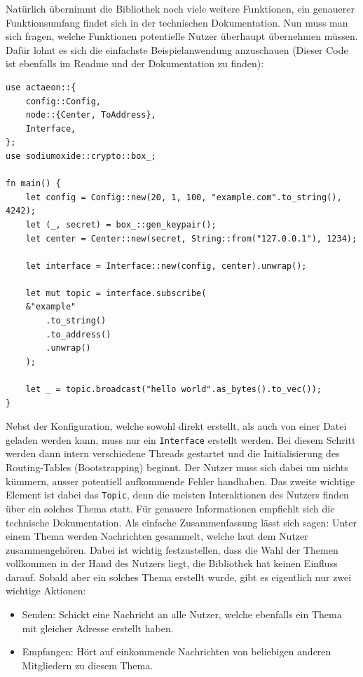 \documentclass[a4paper,11pt,titlepage,twoside]{memoir}
\begin{document}
\noindent Natürlich übernimmt die Bibliothek noch viele weitere
Funktionen, ein genauerer Funktionsumfang findet sich in der
technischen Dokumentation. Nun muss man sich fragen, welche Funktionen
potentielle Nutzer überhaupt übernehmen müssen. Dafür lohnt es sich
die einfachste Beispielanwendung anzuschauen (Dieser Code ist
ebenfalls im Readme und der Dokumentation zu finden):
\begin{verbatim}
use actaeon::{
    config::Config,
    node::{Center, ToAddress},
    Interface,
};
use sodiumoxide::crypto::box_;

fn main() {
    let config = Config::new(20, 1, 100, "example.com".to_string(), 4242);
    let (_, secret) = box_::gen_keypair();
    let center = Center::new(secret, String::from("127.0.0.1"), 1234);

    let interface = Interface::new(config, center).unwrap();

    let mut topic = interface.subscribe(
	&"example"
	    .to_string()
	    .to_address()
	    .unwrap()
    );

    let _ = topic.broadcast("hello world".as_bytes().to_vec());
}
\end{verbatim}

\noindent Nebst der Konfiguration, welche sowohl direkt erstellt, als
auch von einer Datei geladen werden kann, muss nur ein \texttt{Interface}
erstellt werden. Bei diesem Schritt werden dann intern verschiedene
Threads gestartet und die Initialisierung des Routing-Tables
(Bootstrapping) beginnt. Der Nutzer muss sich dabei um nichts kümmern,
ausser potentiell aufkommende Fehler handhaben. Das zweite wichtige
Element ist dabei das \texttt{Topic}, denn die meisten Interaktionen des
Nutzers finden über ein solches Thema statt. Für genauere
Informationen empfiehlt sich die technische Dokumentation. Als
einfache Zusammenfassung lässt sich sagen: Unter einem Thema werden
Nachrichten gesammelt, welche laut dem Nutzer zusammengehören. Dabei
ist wichtig festzustellen, dass die Wahl der Themen vollkommen in der
Hand des Nutzers liegt, die Bibliothek hat keinen Einfluss darauf.
Sobald aber ein solches Thema erstellt wurde, gibt es eigentlich nur
zwei wichtige Aktionen:
\begin{itemize}
\item Senden: Schickt eine Nachricht an alle Nutzer, welche ebenfalls ein
Thema mit gleicher Adresse erstellt haben.
\item Empfangen: Hört auf einkommende Nachrichten von beliebigen anderen
Mitgliedern zu diesem Thema.
\end{itemize}
\end{document}
